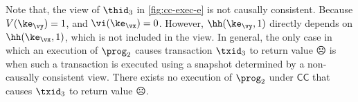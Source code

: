 Note that, the view of $\thid_3$ in \cref{fig:cc-exec-e} is not causally consistent.
Because $V(\ke_{\vy}) = 1$, and $\vi(\ke_{\vx}) = 0$. 
However, $\hh(\ke_{\vy},1)$ directly depends on $\hh(\ke_{\vx},1)$, which is not included in the view. 
In general, the only case in which an execution of $\prog_2$ causes transaction $\txid_3$ to return value $\sadface$ is when such a transaction is executed using a snapshot determined by a non-causally consistent view. 
There exists no execution of $\prog_2$ under $\mathsf{CC}$ that causes $\txid_3$ to return value $\sadface$.


%
